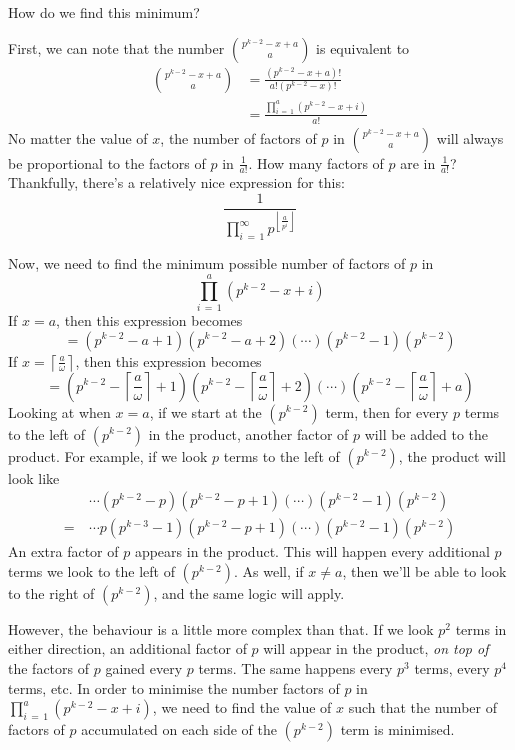 \documentclass[a4paper, 12pt, reqno]{amsart}
\newcommand\ceil[1]{\left\lceil #1 \right\rceil}
\newcommand\floor[1]{\left\lfloor #1 \right\rfloor}
\begin{document}
		How do we find this minimum?
		
		First, we can note that the number $\binom{p^{k-2}-x+a}{a}$ is equivalent to
		\begin{align*}
			\binom{p^{k-2}-x+a}{a} &= \frac{(p^{k-2}-x+a)!}{a!(p^{k-2}-x)!}\\
			                       &= \frac{\prod_{i\,=\,1}^a (p^{k-2}-x+i)}{a!}
		\end{align*}
		No matter the value of $x$, the number of factors of $p$ in $\binom{p^{k-2}-x+a}{a}$ will always be proportional to the factors of $p$ in $\frac{1}{a!}$. How many 
		factors of $p$ are in $\frac{1}{a!}$? Thankfully, there's a relatively nice expression for this:
		\[
			\frac{1}{\prod_{i\,=\,1}^\infty p^{\floor{\frac{a}{p^i}}}}
		\]
		
		Now, we need to find the minimum possible number of factors of $p$ in
		\[
			\prod_{i\,=\,1}^a (p^{k-2}-x+i)
		\]
		If $x = a$, then this expression becomes
		\[
			= (p^{k-2}-a+1)(p^{k-2}-a+2)(\cdots)(p^{k-2}-1)(p^{k-2})
		\]
		If $x = \ceil{\frac{a}{\omega}}$, then this expression becomes
		\[
			= (p^{k-2}-\ceil{\frac{a}{\omega}}+1)(p^{k-2}-\ceil{\frac{a}{\omega}}+2)(\cdots)(p^{k-2}-\ceil{\frac{a}{\omega}}+a)
		\]
		Looking at when $x = a$, if we start at the $(p^{k-2})$ term, then for every $p$ terms to the left of $(p^{k-2})$ in the product, another factor of $p$ will 
		be added to the product. For example, if we look $p$ terms to the left of $(p^{k-2})$, the product will look like
		\begin{align*}
			 & \ \cdots(p^{k-2}-p)(p^{k-2}-p+1)(\cdots)(p^{k-2}-1)(p^{k-2}) \\
			=& \ \cdots p(p^{k-3}-1)(p^{k-2}-p+1)(\cdots)(p^{k-2}-1)(p^{k-2})
		\end{align*}
		An extra factor of $p$ appears in the product. This will happen every additional $p$ terms we look to the left of $(p^{k-2})$. As well, if $x \neq a$, then we'll be
		able to look to the right of $(p^{k-2})$, and the same logic will apply. 
		
		However, the behaviour is a little more complex than that. If we look $p^2$ terms in either direction, an additional factor of $p$ will appear in the product, 
		\emph{on top of} the factors of $p$ gained every $p$ terms. The same happens every $p^3$ terms, every $p^4$ terms, etc. In order to minimise the number factors of $p$
		in $\prod_{i\,=\,1}^a (p^{k-2}-x+i)$, we need to find the value of $x$ such that the number of factors of $p$ accumulated on each side of the $(p^{k-2})$ term is
		minimised.
		
\end{document}
